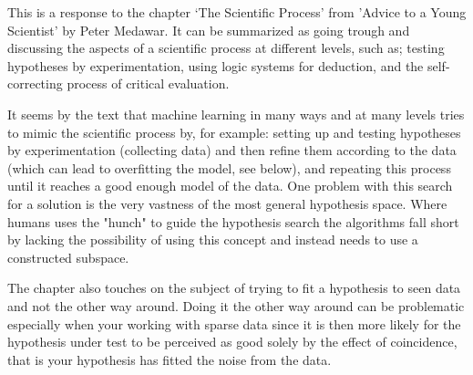 \documentclass{article}
\begin{document}
    This is a response to the chapter `The Scientific Process' from
    'Advice to a Young Scientist' by Peter Medawar. It can be summarized as going
    trough and discussing the aspects of a scientific process at different
    levels, such as; testing hypotheses by experimentation, using logic 
    systems for deduction,  and
    the self-correcting process of critical evaluation.

    It seems by the text that machine learning in many ways and at many levels tries 
    to mimic 
    the scientific process by, for example: setting up and testing hypotheses by
    experimentation (collecting data) and then refine them 
    according to the data (which can lead to overfitting the model, see below), 
    and repeating this process until it reaches a good enough model of the 
    data. One problem with this search for a solution is the very
    vastness of the most general hypothesis space. Where humans uses the 
    "hunch" to guide the hypothesis search the algorithms fall short by lacking 
    the possibility of using this concept and instead needs to use a constructed
    subspace.

    The chapter also touches on the subject of trying to fit a hypothesis 
    to seen data and not the other way around. Doing it the other way around 
    can be problematic especially when your working with sparse data since it 
    is then more likely for the hypothesis under test to be perceived as good 
    solely by the effect of coincidence, that is your hypothesis has fitted the
    noise from the data.
\end{document}
